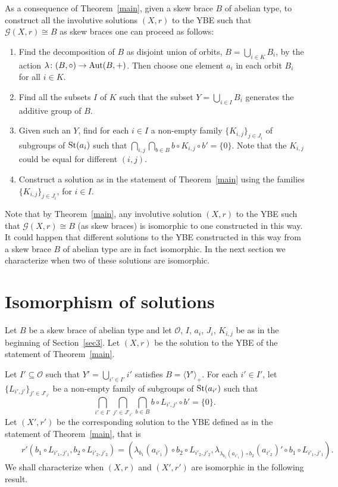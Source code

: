 As a consequence of Theorem~\ref{main}, given a skew brace $B$ of abelian type, to
construct all the involutive solutions $(X,r)$ to the YBE such that
$\mathcal{G}(X,r)\cong B$ as skew braces one can proceed as follows:
\begin{enumerate}
	\item Find the decomposition of $B$ as disjoint union of orbits, $B=\bigcup_{i\in K} B_i$, by the action $\lambda\colon (B,\circ)\to \operatorname{Aut}(B,+)$.
	Then choose one element $a_i$ in each orbit $B_i$ for all $i\in K$.
	
	\item Find all the subsets $I$ of $K$ such that the subset
	$Y=\bigcup_{i\in I}B_i$ generates the additive group of $B$.
	
	\item Given such an $Y$, find for each $i\in I$ a non-empty family $\{K_{i,j}\}_{j\in
		J_i}$ of subgroups of $\operatorname{St}(a_i)$ such that $\bigcap_{i,j}
	\bigcap_{b\in B}b\circ K_{i,j}\circ b'=\{ 0\}$. Note that the $K_{i,j}$
	could be equal for different $(i,j)$.
	
	\item Construct a solution as in the statement of
	Theorem~\ref{main} using the families $\{K_{i,j}\}_{j\in J_i}$, for
	$i\in I$.
\end{enumerate}

Note that by Theorem~\ref{main}, any involutive solution $(X,r)$ to the YBE
such that $\mathcal{G}(X,r)\cong B$  (as skew braces) is isomorphic
to one constructed in this way. It could happen that different
solutions to the YBE constructed in this way from a skew brace $B$ of abelian type
are in fact isomorphic. In the next section we characterize when two
of these solutions are isomorphic.



\section{Isomorphism of solutions} \label{construciso}
Let $B$ be a skew brace of abelian type and let $\mathcal{O}$, $I$, $a_i$, $J_i$,
$K_{i,j}$ be as in the beginning of Section~\ref{sec3}. Let $(X,r)$
be the solution to the YBE of the statement of Theorem~\ref{main}.

Let $I'\subseteq \mathcal{O}$ such that $Y'=\bigcup_{i'\in I'}i'$
satisfies $B=\langle Y'\rangle_+$. For each $i'\in I'$, let $\{
L_{i',j'} \}_{j'\in J'_{i'}}$ be a non-empty family of subgroups of
$\operatorname{St}(a_{i'})$ such that
$$\bigcap_{i'\in I'}\bigcap_{j'\in J'_{i'}}\bigcap_{b\in B}b\circ L_{i',j'}\circ b'=\{ 0\}.$$
Let $(X',r')$ be the corresponding solution to the YBE defined as in
the statement of Theorem~\ref{main}, that is
\begin{eqnarray*}
	&&r'(b_1\circ L_{i'_1,j'_1},b_2\circ L_{i'_2,j'_2})=(\lambda_{b_1}(a_{i'_1})\circ b_2\circ L_{i'_2,j'_2},\lambda_{\lambda_{b_1}(a_{i'_1})\circ b_2}(a_{i'_2})'\circ b_1\circ L_{i'_1,j'_1}).
\end{eqnarray*}
We shall characterize when $(X,r)$ and $(X',r')$ are isomorphic in
the following result.

